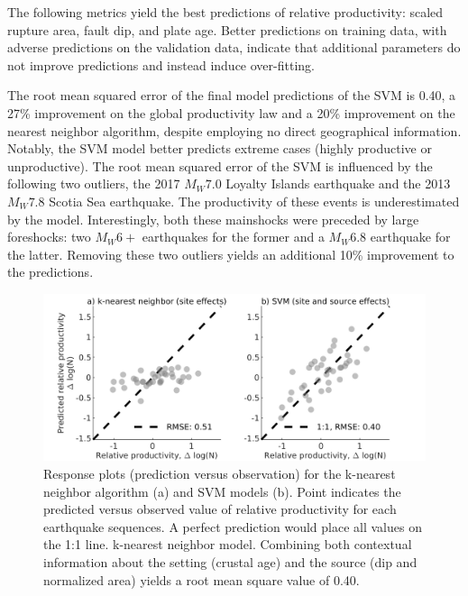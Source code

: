 \documentclass[draft, jgrga]{agujournal2018}
\begin{document}
    The following metrics yield the best predictions of relative productivity: scaled rupture area, fault dip, and plate age. Better predictions on training data, with adverse predictions on the validation data, indicate that additional parameters do not improve predictions and instead induce over-fitting.
    
    The root mean squared error of the final model predictions of the SVM is 0.40, a 27\% improvement on the global productivity law and a 20\% improvement on the nearest neighbor algorithm, despite employing no direct geographical information. Notably, the SVM model better predicts extreme cases (highly productive or unproductive). The root mean squared error of the SVM is influenced by the following two outliers, the 2017 $M_W7.0$ Loyalty Islands earthquake and the 2013 $M_W7.8$ Scotia Sea earthquake. The productivity of these events is underestimated by the model. Interestingly, both these mainshocks were preceded by large foreshocks: two $M_W6+$ earthquakes for the former and a $M_W6.8$ earthquake for the latter. Removing these two outliers yields an additional 10\% improvement to the predictions.
    
    \begin{figure}
        \centering
        \includegraphics{figures/response.png}
        \caption{Response plots (prediction versus observation) for the k-nearest neighbor algorithm (a) and SVM models (b). Point indicates the predicted versus observed value of relative productivity for each earthquake sequences. A perfect prediction would place all values on the 1:1 line.  k-nearest neighbor model. Combining both contextual information about the setting (crustal age) and the source (dip and normalized area) yields a root mean square value of 0.40.}
        \label{fig:response}
    \end{figure}
    
\end{document}

